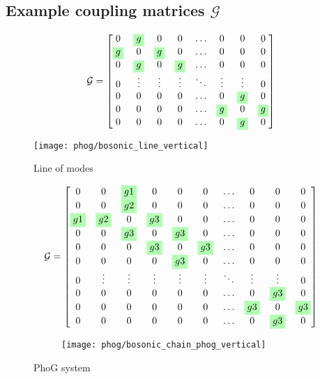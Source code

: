 \subsection{Example coupling matrices $\mathcal{G}$}
\begin{figure}[htp]
\begin{minipage}{.4\textwidth}
\[
\mathcal{G} = 
\begin{bmatrix}
0 & \highlight{g} & 0 & 0 & \dots & 0 & 0 & 0 \\
\highlight{g} & 0 & \highlight{g} & 0 & \dots & 0 & 0 & 0 \\
0 & \highlight{g} & 0 & \highlight{g} & \dots & 0 & 0 & 0  \\
0 & \vdots & \vdots & \vdots & \ddots & \vdots & \vdots & 0 \\
0 & 0 & 0 & 0 & \dots & 0 & \highlight{g} & 0 \\
0 & 0 & 0 & 0 & \dots & \highlight{g} & 0 & \highlight{g} \\
0 & 0 & 0 & 0 & \dots & 0 & \highlight{g} & 0
\end{bmatrix}
\]
\end{minipage}
\begin{minipage}{.5\textwidth}
\centering
\texttt{[image: phog/bosonic\_line\_vertical]}
\end{minipage}
\caption{\label{fig:coupline}Line of modes}
\end{figure}



\begin{figure}[htp]
\begin{minipage}{.4\textwidth}
\[
\mathcal{G} = 
\begin{bmatrix}
0 & 0 & \highlight{g1} & 0 & 0 & 0 & \dots & 0 & 0 & 0 \\
0 & 0 & \highlight{g2} & 0 & 0 & 0 & \dots & 0 & 0 & 0 \\
\highlight{g1} & \highlight{g2} & 0 & \highlight{g3} & 0 & 0 & \dots & 0 & 0 & 0 \\
0 & 0 & \highlight{g3} & 0 & \highlight{g3} & 0 & \dots & 0 & 0 & 0 \\
0 & 0 & 0 & \highlight{g3} & 0 & \highlight{g3} & \dots & 0 & 0 & 0 \\
0 & 0 & 0 & 0 & \highlight{g3} & 0 & \dots & 0 & 0 & 0  \\
0 & \vdots & \vdots & \vdots & \vdots & \vdots & \ddots & \vdots & \vdots & 0 \\
0 & 0 & 0 & 0 & 0 & 0 & \dots & 0 & \highlight{g3} & 0 \\
0 & 0 & 0 & 0 & 0 & 0 & \dots & \highlight{g3} & 0 & \highlight{g3} \\
0 & 0 & 0 & 0 & 0 & 0 & \dots & 0 & \highlight{g3} & 0 
\end{bmatrix}
\]
\end{minipage}
\begin{subfigure}{.4\textwidth}
\centering
\texttt{[image: phog/bosonic\_chain\_phog\_vertical]}
\end{subfigure}
\caption{\label{fig:coupPhoG}PhoG system }
\end{figure}
\clearpage
